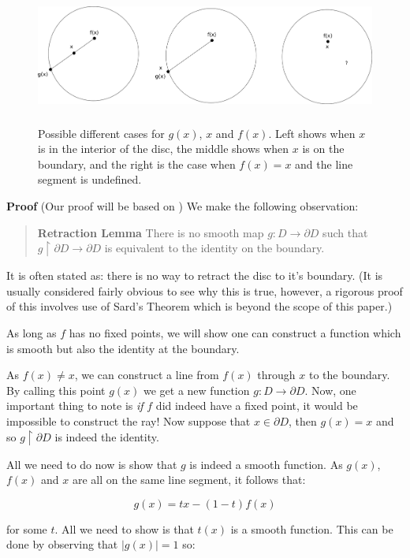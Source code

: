 \documentclass[a4paper]{article}
\begin{document}
\begin{figure}
\includegraphics[height=4.5cm]{fixedpoint}
\centering
\caption{Possible different cases for $g(x)$, $x$ and $f(x)$. Left shows when $x$ is in the interior of the disc, the middle shows when $x$ is on the boundary, and the right is the case when $f(x) = x$ and the line segment is undefined.}
\end{figure}

\textbf{Proof} (Our proof will be based on \cite{guil}) We make the following observation: 

\begin{quote}
    \textbf{Retraction Lemma} There is no smooth map $g : D \to \partial D$ such that $g \upharpoonright \partial D \to \partial D$ is equivalent to the identity on the boundary.
\end{quote}

It is often stated as: there is no way to retract the disc to it's boundary. (It is usually considered fairly obvious to see why this is true, however, a rigorous proof of this involves use of Sard's Theorem which is beyond the scope of this paper.)

As long as $f$ has no fixed points, we will show one can construct a function which is smooth but also the identity at the boundary.

As $f(x) \neq x$, we can construct a line from $f(x)$ through $x$ to the boundary. By calling this point $g(x)$ we get a new function $g : D \to \partial D$. Now, one important thing to note is \textit{if} $f$ did indeed have a fixed point, it would be impossible to construct the ray! Now suppose that $x \in \partial D$, then $g(x) = x$ and so $g \upharpoonright \partial D$ is indeed the identity.

All we need to do now is show that $g$ is indeed a smooth function. As $g(x)$, $f(x)$ and $x$ are all on the same line segment, it follows that:

$$g(x) = tx - (1 - t)f(x)$$

for some $t$. All we need to show is that $t(x)$ is a smooth function. This can be done by observing that $|g(x)| = 1$ so:
\end{document}
